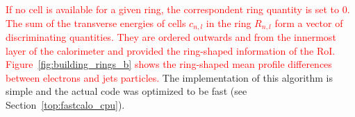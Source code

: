 


\textcolor{red}{
If no cell is available for a given ring, the correspondent ring
quantity is set to 0.
The sum of the transverse energies of cells $c_{n,l}$ in the ring $R_{n,l}$ form a vector of discriminating quantities. 
They are ordered outwards and from the
innermost layer of the calorimeter and provided the ring-shaped information 
of the RoI. Figure~\ref{fig:building_rings_b} shows the ring-shaped mean profile differences between electrons and jets particles.} The implementation of this algorithm is simple and the actual code
was optimized to be fast (see Section~\ref{top:fastcalo_cpu}). 









%


